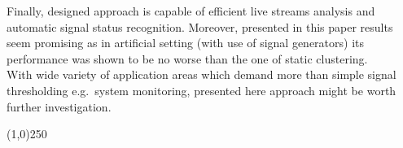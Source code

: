 \documentclass[11pt, letterpaper]{article}            %
\begin{document}
Finally, designed approach is capable of efficient live streams analysis and automatic signal status recognition. Moreover, presented in this paper results seem promising as in artificial setting (with use of signal generators) its performance was shown to be no worse than the one of static clustering.\\
With wide variety of application areas which demand more than simple signal thresholding e.g.\ system monitoring, presented here approach might be worth further investigation.



\begin{center} \noindent \line(1,0){250} \end{center}       %


\newpage                                                                 %
{}

\end{document}
